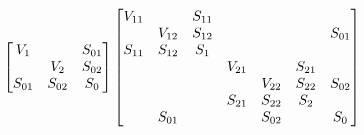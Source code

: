 \documentclass{standalone}
\begin{document}
\[
\begin{bmatrix}
    V_1 &  & S_{01} \\
     & V_{2} & S_{02} \\
    S_{01} & S_{02} & S_{0} \\
\end{bmatrix}

\space \space \space \space \space

\begin{bmatrix}
    \begin{matrix} V_{11} & & S_{11} \\ & V_{12} & S_{12} \\ S_{11} & S_{12} & S_{1} \end{matrix} &  & S_{01} \\
     & \begin{matrix} V_{21} & & S_{21} \\ & V_{22} & S_{22} \\ S_{21} & S_{22} & S_{2} \end{matrix} & S_{02} \\
    S_{01} & S_{02} & S_{0} \\
\end{bmatrix}



\]
\end{document}
